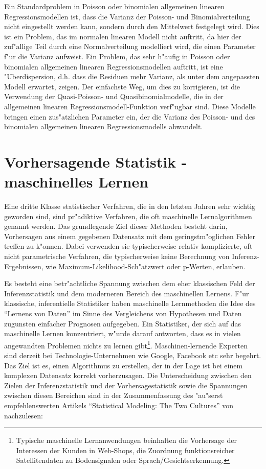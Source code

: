 \documentclass[a4paper,twoside]{tufte-book}\usepackage[]{graphicx}\usepackage[]{color}
\begin{document}
Ein Standardproblem in Poisson oder binomialen allgemeinen linearen Regressionsmodellen ist, dass die Varianz der Poisson- und Binomialverteilung nicht eingestellt werden kann, sondern durch den Mittelwert festgelegt wird. Dies ist ein Problem, das im normalen linearen Modell nicht auftritt, da hier der zuf"allige Teil durch eine Normalverteilung modelliert wird, die einen Parameter f"ur die Varianz aufweist. Ein Problem, das sehr h"aufig in Poisson oder binomialen allgemeinen linearen Regressionsmodellen auftritt, ist eine "Uberdispersion, d.h. dass die Residuen mehr Varianz, als unter dem angepassten Modell erwartet, zeigen.  Der einfachste Weg, um dies zu korrigieren, ist die Verwendung der Quasi-Poisson- und Quasibinomialmodelle, die in der allgemeinen linearen Regressionsmodell-Funktion verf"ugbar sind. Diese Modelle bringen einen zus"atzlichen Parameter ein, der die Varianz des Poisson- und des binomialen allgemeinen linearen Regressionsmodells abwandelt.


\chapter{Vorhersagende Statistik - maschinelles Lernen}

Eine dritte Klasse statistischer Verfahren, die in den letzten Jahren sehr wichtig geworden sind, sind pr"adiktive Verfahren, die oft maschinelle Lernalgorithmen genannt werden. Das grundlegende Ziel dieser Methoden besteht darin, Vorhersagen aus einem gegebenen Datensatz mit dem geringstm"oglichen Fehler treffen zu k"onnen. Dabei verwenden sie typischerweise relativ komplizierte, oft nicht parametrische Verfahren, die typischerweise keine Berechnung von Inferenz-Ergebnissen, wie Maximum-Likelihood-Sch"atzwert oder p-Werten, erlauben.

Es besteht eine betr"achtliche Spannung zwischen dem eher klassischen Feld der Inferenzstatistik und dem moderneren Bereich des maschinellen Lernens. F"ur klassische, inferentielle Statistiker haben maschinelle Lernmethoden die Idee des "`Lernens von Daten"' im Sinne des Vergleichens von Hypothesen und Daten zugunsten einfacher Prognosen aufgegeben. Ein Statistiker, der sich auf das maschinelle Lernen konzentriert, w"urde darauf antworten, dass es in vielen angewandten Problemen nichts zu lernen gibt\footnote{Typische maschinelle Lernanwendungen beinhalten die Vorhersage der Interessen der Kunden in Web-Shops, die Zuordnung funktionsreicher Satellitendaten zu Bodensignalen oder Sprach/Gesichtserkennung.}. Maschinen-lernende Experten sind derzeit bei Technologie-Unternehmen wie Google, Facebook etc sehr begehrt. Das Ziel ist es, einen Algorithmus zu erstellen, der in der Lage ist bei einem komplexen Datensatz korrekt vorherzusagen. Die Unterscheidung zwischen den Zielen der Inferenzstatistik und der Vorhersagestatistik sowie die Spannungen zwischen diesen Bereichen sind in der Zusammenfassung des "au"serst empfehlenswerten Artikels "`Statistical Modeling: The Two Cultures"' von \citet{Breiman-StatisticalModelingTwo-2001} nachzulesen:
\end{document}
